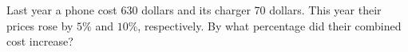 Last year a phone cost 630 dollars and its charger 70 dollars. This year their prices rose by $5\%$ and $10\%$, respectively. By what percentage did their combined cost increase?
